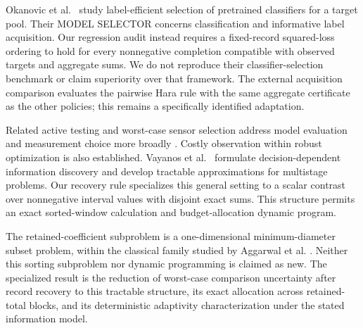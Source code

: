 \documentclass[12pt]{article}
\begin{document}
Okanovic et al.~\cite{okanovic2025} study label-efficient selection of
pretrained classifiers for a target pool. Their MODEL SELECTOR concerns
classification and informative label acquisition. Our regression audit
instead requires a fixed-record squared-loss ordering to hold for every
nonnegative completion compatible with observed targets and aggregate sums.
We do not reproduce their classifier-selection benchmark or claim superiority
over that framework. The external acquisition comparison evaluates the
pairwise Hara rule with the same aggregate certificate as the other policies;
this remains a specifically identified adaptation.

Related active testing and worst-case sensor selection address model
evaluation and measurement choice more broadly \cite{active,sensorsel}.
Costly observation within robust optimization is also established.
Vayanos et al.\ \cite{ddid} formulate decision-dependent information
discovery and develop tractable approximations for multistage problems.
Our recovery rule specializes this general setting to a scalar contrast
over nonnegative interval values with disjoint exact sums. This structure
permits an exact sorted-window calculation and budget-allocation dynamic
program.

The retained-coefficient subproblem is a one-dimensional minimum-diameter
subset problem, within the classical family studied by Aggarwal et al.
\cite{aggarwal}. Neither this sorting subproblem nor dynamic programming
is claimed as new. The specialized result is the reduction of worst-case
comparison uncertainty after record recovery to this tractable structure,
its exact allocation across retained-total blocks, and its deterministic
adaptivity characterization under the stated information model.
\end{document}
